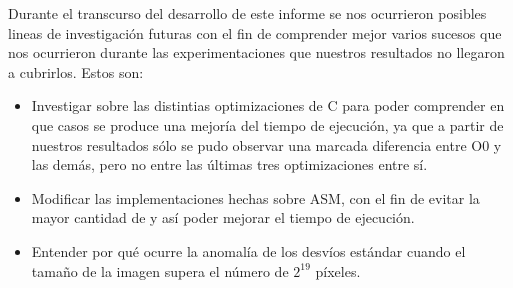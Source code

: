 \documentclass[a4paper]{article}
\begin{document}
\justify
Durante el transcurso del desarrollo de este informe se nos ocurrieron posibles lineas de investigación futuras con el fin de comprender mejor varios sucesos que nos ocurrieron durante las experimentaciones que nuestros resultados no llegaron a cubrirlos. Estos son:
\begin{itemize}
	\item  Investigar sobre las distintias optimizaciones de C para poder comprender en que casos se produce una mejoría del tiempo de ejecución, ya que a partir de nuestros resultados sólo se pudo observar una marcada diferencia entre O0 y las demás, pero no entre las últimas tres optimizaciones entre sí.
	\item Modificar las implementaciones hechas sobre ASM, con el fin de evitar la mayor cantidad de  y así poder mejorar el tiempo de ejecución.
	\item Entender por qué ocurre la anomalía de los desvíos estándar cuando el tamaño de la imagen supera el número de $2^{19}$ píxeles.  
\end{itemize}  
\end{document}
